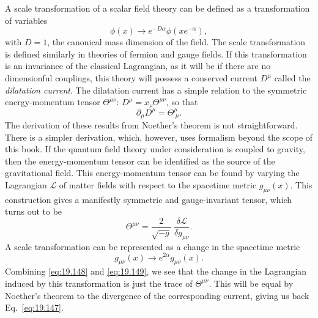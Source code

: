 A scale transformation of a scalar field theory can be defined as a
transformation of variables
\begin{equation}
  \phi(x) \to e^{-D\alpha}\phi(x e^{-\alpha}) ,
  \label{eq:19.146}
\end{equation}
with $D = 1$, the canonical mass dimension of the field.  The scale
transformation is defined similarly in theories of fermion and gauge fields.
If this transformation is an invariance of the classical Lagrangian, as it
will be if there are no dimensionful couplings, this theory will possess a
conserved current $D^\mu$ called the \emph{dilatation current}.  The
dilatation current has a simple relation to the symmetric energy-momentum
tensor $\Theta^{\mu\nu}$: $D^\mu = x_\nu\Theta^{\mu\nu}$, so that
\begin{equation}
  \partial_\mu D^\mu = \Theta^\mu_{\ \mu} .
  \label{eq:19.147}
\end{equation}
The derivation of these results from Noether's theorem is not
straightforward.  There is a simpler derivation, which, however, uses
formalism beyond the scope of this book.  If the quantum field theory under
consideration is coupled to gravity, then the energy-momentum tensor can be
identified as the source of the gravitational field.  This energy-momentum
tensor can be found by varying the Lagrangian $\mathcal{L}$ of matter fields
with respect to the spacetime metric $g_{\mu\nu}(x)$.  This construction
gives a manifestly symmetric and gauge-invariant tensor, which turns out to
be
\begin{equation}
  \Theta^{\mu\nu} = \frac{2}{\sqrt{-g}}\ \frac{\delta\mathcal{L}}
    {\delta g_{\mu\nu}} .
  \label{eq:19.148}
\end{equation}
A scale transformation can be represented as a change in the spacetime metric
\begin{equation}
  g_{\mu\nu}(x) \to e^{2\alpha}g_{\mu\nu}(x) .
  \label{eq:19.149}
\end{equation}
Combining \eqref{eq:19.148} and \eqref{eq:19.149}, we see that the change in
the Lagrangian induced by this transformation is just the trace of
$\Theta^{\mu\nu}$.  This will be equal by Noether's theorem to the divergence
of the corresponding current, giving us back Eq.~\eqref{eq:19.147}.

